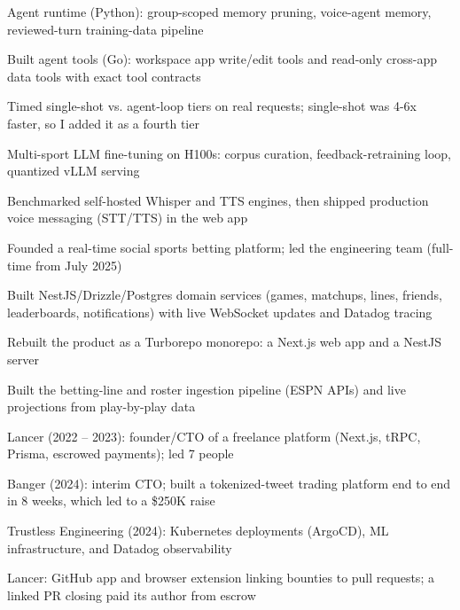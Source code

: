 \documentclass[print]{jack-resume}
\begin{document}
\begin{tightemize}
    \item Agent runtime (Python): group-scoped memory pruning, voice-agent memory, reviewed-turn training-data pipeline
    \item Built agent tools (Go): workspace app write/edit tools and read-only cross-app data tools with exact tool contracts
    \item Timed single-shot vs. agent-loop tiers on real requests; single-shot was 4-6x faster, so I added it as a fourth tier
    \item Multi-sport LLM fine-tuning on H100s: corpus curation, feedback-retraining loop, quantized vLLM serving
    \item Benchmarked self-hosted Whisper and TTS engines, then shipped production voice messaging (STT/TTS) in the web app
\end{tightemize}
\sectionsep

\begin{tightemize}
    \item Founded a real-time social sports betting platform; led the engineering team (full-time from July 2025)
    \item Built NestJS/Drizzle/Postgres domain services (games, matchups, lines, friends, leaderboards, notifications) with live WebSocket updates and Datadog tracing
    \item Rebuilt the product as a Turborepo monorepo: a Next.js web app and a NestJS server
    \item Built the betting-line and roster ingestion pipeline (ESPN APIs) and live projections from play-by-play data
\end{tightemize}
\sectionsep

\begin{tightemize}
    \item Lancer (2022 -- 2023): founder/CTO of a freelance platform (Next.js, tRPC, Prisma, escrowed payments); led 7 people
    \item Banger (2024): interim CTO; built a tokenized-tweet trading platform end to end in 8 weeks, which led to a \$250K raise
    \item Trustless Engineering (2024): Kubernetes deployments (ArgoCD), ML infrastructure, and Datadog observability
    \item Lancer: GitHub app and browser extension linking bounties to pull requests; a linked PR closing paid its author from escrow
\end{tightemize}
\sectionsep
\end{document}
